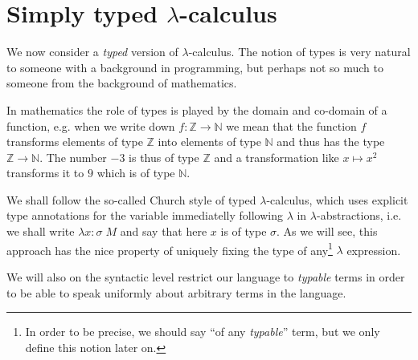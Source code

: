 \section{Simply typed $\lambda$-calculus}

We now consider a \emph{typed} version of $\lambda$-calculus. The notion of
types is very natural to someone with a background in programming, but perhaps
not so much to someone from the background of mathematics.

In mathematics the role of types is played by the domain and co-domain of a
function, e.g. when we write down $f: \mathbb{Z} \rightarrow \mathbb{N}$ we
mean that the function $f$ transforms elements of type $\mathbb{Z}$ into
elements of type $\mathbb{N}$ and thus has the type $\mathbb{Z} \rightarrow
\mathbb{N}$. The number $-3$ is thus of type $\mathbb{Z}$ and a transformation like
$x \mapsto x^2$ transforms it to $9$ which is of type $\mathbb{N}$.

We shall follow the so-called Church style of typed $\lambda$-calculus, which
uses explicit type annotations for the variable immediatelly following
$\lambda$ in $\lambda$-abstractions, i.e. we shall write $\lambda
x\!:\!\sigma\; M$ and say that here $x$ is of type $\sigma$. As we will see,
this approach has the nice property of uniquely fixing the type of
any\footnote{
    In order to be precise, we should say ``of any \emph{typable}''
    term, but we only define this notion later on.}
$\lambda$ expression.

We will also on the syntactic level restrict our language to \emph{typable}
terms in order to be able to speak uniformly about arbitrary terms in the
language.

